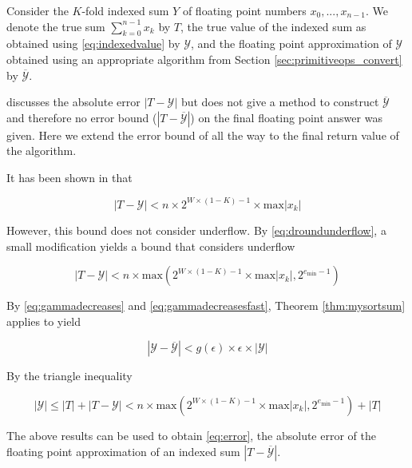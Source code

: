 \documentclass[12pt]{article}
\providecommand{\min}{\ensuremath{\text{min}}}
\providecommand{\max}{\ensuremath{\text{max}}}
\theoremstyle{definition}
\numberwithin{equation}{section}
\numberwithin{figure}{section}
\begin{document}
    Consider the $K$-fold indexed sum $Y$ of floating point numbers $x_0, ..., x_{n - 1}$. We denote the true sum $\sum \limits_{k = 0}^{n - 1} x_k$ by $T$, the true value of the indexed sum as obtained using  \eqref{eq:indexedvalue} by $\mathcal{Y}$, and the floating point approximation of $\mathcal{Y}$ obtained using an appropriate algorithm from Section \ref{sec:primitiveops_convert} by $\overline{\mathcal{Y}}$.

    \cite{repsum} discusses the absolute error $|T - \mathcal{Y}|$ but does not give a method to construct $\overline{\mathcal{Y}}$ and therefore no error bound ($|T - \overline{\mathcal{Y}}|$) on the final floating point answer was given. Here we extend the error bound of \cite{repsum} all the way to the final return value of the algorithm.

    It has been shown in \cite{repsum} that

    \begin{equation}
      \label{eq:repboundnaive}
      |T - \mathcal{Y}| < n \times 2^{W \times (1 - K) - 1} \times \max|x_k|
    \end{equation}

    However, this bound does not consider underflow. By  \eqref{eq:droundunderflow}, a small modification yields a bound that considers underflow

    \begin{equation}
      \label{eq:repbound}
      |T - \mathcal{Y}| < n \times \max(2^{W \times (1 - K) - 1} \times \max|x_k|, 2^{e_{\min} - 1})
    \end{equation}

    By  \eqref{eq:gammadecreases} and \eqref{eq:gammadecreasesfast}, Theorem \ref{thm:mysortsum} applies to yield

    \begin{equation*}
      |\mathcal{Y} - \overline{\mathcal{Y}}| < g(\epsilon)\times\epsilon\times|\mathcal{Y}|
    \end{equation*}

    By the triangle inequality

    \begin{equation*}
      |\mathcal{Y}| \leq |T| + |T - \mathcal{Y}| < n \times \max(2^{W \times (1 - K) - 1} \times \max|x_k|, 2^{e_{\min} - 1}) + |T|
    \end{equation*}

    The above results can be used to obtain  \eqref{eq:error}, the absolute error of the floating point approximation of an indexed sum $|T - \overline{\mathcal{Y}}|$.
\end{document}
